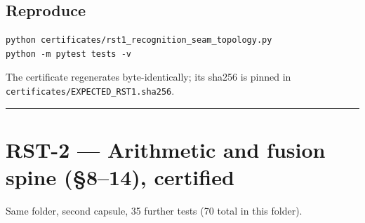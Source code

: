 \hypertarget{reproduce}{%
\section{Reproduce}\label{reproduce}}

\begin{verbatim}
python certificates/rst1_recognition_seam_topology.py
python -m pytest tests -v
\end{verbatim}

The certificate regenerates byte-identically; its sha256 is pinned in
\texttt{certificates/EXPECTED\_RST1.sha256}.

\begin{center}\rule{0.5\linewidth}{0.5pt}\end{center}

\hypertarget{rst-2-arithmetic-and-fusion-spine-814-certified}{%
\chapter{RST-2 --- Arithmetic and fusion spine (§8--14), certified}\label{rst-2-arithmetic-and-fusion-spine-814-certified}}

Same folder, second capsule, 35 further tests (70 total in this folder).

